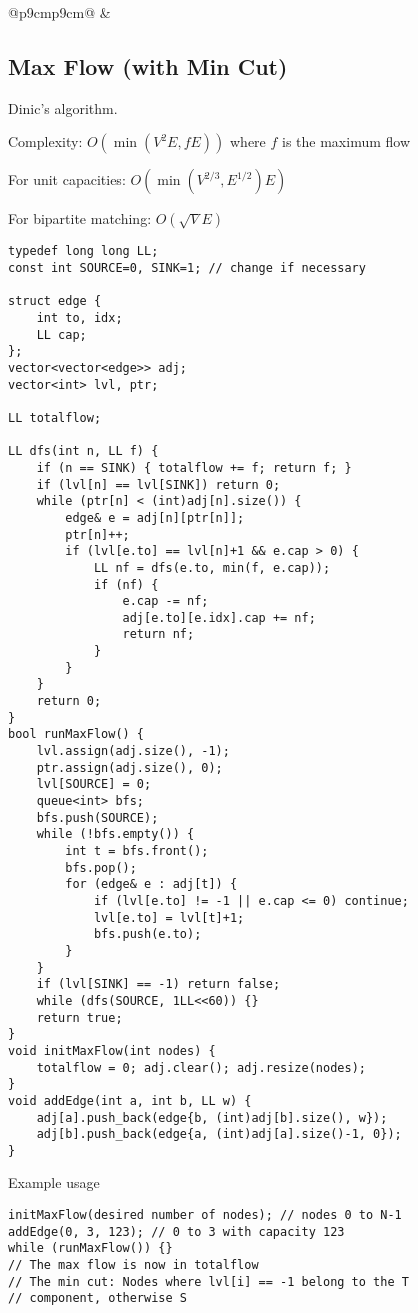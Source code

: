 \documentclass[letterpaper]{article}
\begin{document}
\clearpage

\begin{tabular}{@{}p{9cm}p{9cm}@{}}
     &
    \subsection{Max Flow (with Min Cut)}

    Dinic's algorithm.

    Complexity: $O\left(\min\left(V^2E, fE\right)\right)$ where $f$ is the maximum flow

    For unit capacities: $O\left(\min\left(V^{2/3}, E^{1/2}\right)E\right)$

    For bipartite matching: $O\left(\sqrt VE\right)$

    \begin{lstlisting}
typedef long long LL;
const int SOURCE=0, SINK=1; // change if necessary

struct edge {
	int to, idx;
	LL cap;
};
vector<vector<edge>> adj;
vector<int> lvl, ptr;

LL totalflow;

LL dfs(int n, LL f) {
	if (n == SINK) { totalflow += f; return f; }
	if (lvl[n] == lvl[SINK]) return 0;
	while (ptr[n] < (int)adj[n].size()) {
		edge& e = adj[n][ptr[n]];
		ptr[n]++;
		if (lvl[e.to] == lvl[n]+1 && e.cap > 0) {
			LL nf = dfs(e.to, min(f, e.cap));
			if (nf) {
				e.cap -= nf;
				adj[e.to][e.idx].cap += nf;
				return nf;
			}
		}
	}
	return 0;
}
bool runMaxFlow() {
	lvl.assign(adj.size(), -1);
	ptr.assign(adj.size(), 0);
	lvl[SOURCE] = 0;
	queue<int> bfs;
	bfs.push(SOURCE);
	while (!bfs.empty()) {
		int t = bfs.front();
		bfs.pop();
		for (edge& e : adj[t]) {
			if (lvl[e.to] != -1 || e.cap <= 0) continue;
			lvl[e.to] = lvl[t]+1;
			bfs.push(e.to);
		}
	}
	if (lvl[SINK] == -1) return false;
	while (dfs(SOURCE, 1LL<<60)) {}
	return true;
}
void initMaxFlow(int nodes) {
	totalflow = 0; adj.clear(); adj.resize(nodes);
}
void addEdge(int a, int b, LL w) {
	adj[a].push_back(edge{b, (int)adj[b].size(), w});
	adj[b].push_back(edge{a, (int)adj[a].size()-1, 0});
}
\end{lstlisting}
    Example usage
    \begin{lstlisting}
initMaxFlow(desired number of nodes); // nodes 0 to N-1
addEdge(0, 3, 123); // 0 to 3 with capacity 123
while (runMaxFlow()) {}
// The max flow is now in totalflow
// The min cut: Nodes where lvl[i] == -1 belong to the T
// component, otherwise S
\end{lstlisting}
\end{tabular}
\end{document}
